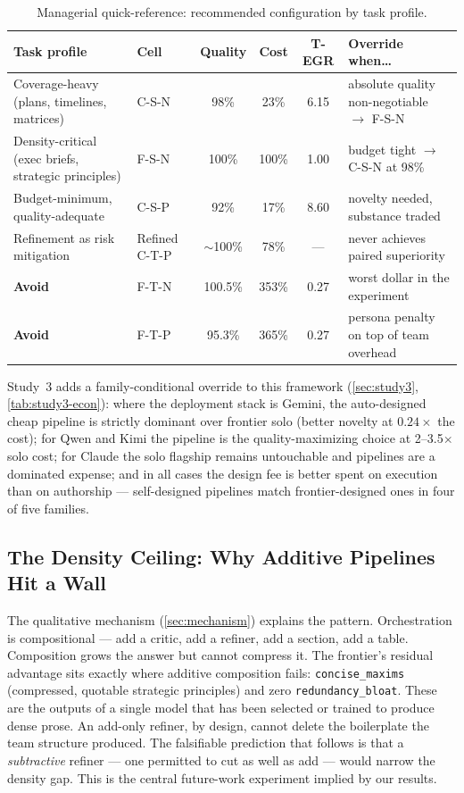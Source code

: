 \documentclass[12pt,a4paper]{article}
\begin{document}
\begin{table}[ht]
  \centering
  \caption{Managerial quick-reference: recommended configuration by task profile.}
  \label{tab:managerial}
  \begin{tabularx}{\textwidth}{@{}l l cc c l@{}}
    \toprule
    \textbf{Task profile} & \textbf{Cell} & \textbf{Quality} & \textbf{Cost} & \textbf{T-EGR} & \textbf{Override when\ldots} \\
    \midrule
    Coverage-heavy (plans, timelines, matrices)
      & C-S-N & 98\% & 23\% & 6.15
      & absolute quality non-negotiable $\to$ F-S-N \\
    Density-critical (exec briefs, strategic principles)
      & F-S-N & 100\% & 100\% & 1.00
      & budget tight $\to$ C-S-N at 98\% \\
    Budget-minimum, quality-adequate
      & C-S-P & 92\% & 17\% & 8.60
      & novelty needed, substance traded \\
    Refinement as risk mitigation
      & Refined C-T-P & $\sim$100\% & 78\% & ---
      & never achieves paired superiority \\
    \textbf{Avoid}
      & F-T-N & 100.5\% & 353\% & 0.27
      & worst dollar in the experiment \\
    \textbf{Avoid}
      & F-T-P & 95.3\% & 365\% & 0.27
      & persona penalty on top of team overhead \\
    \bottomrule
  \end{tabularx}
\end{table}

Study~3 adds a family-conditional override to this framework
(\cref{sec:study3}, \cref{tab:study3-econ}): where the deployment stack is
Gemini, the auto-designed cheap pipeline is strictly dominant over frontier
solo (better novelty at $0.24\times$ the cost); for Qwen and Kimi the pipeline
is the quality-maximizing choice at 2--3.5$\times$ solo cost; for Claude the
solo flagship remains untouchable and pipelines are a dominated expense; and in
all cases the design fee is better spent on execution than on authorship ---
self-designed pipelines match frontier-designed ones in four of five families.

\subsection{The Density Ceiling: Why Additive Pipelines Hit a Wall}

The qualitative mechanism (\cref{sec:mechanism}) explains the pattern.
Orchestration is compositional --- add a critic, add a refiner, add a section,
add a table. Composition grows the answer but cannot compress it. The frontier's
residual advantage sits exactly where additive composition fails:
\texttt{concise\_maxims} (compressed, quotable strategic principles) and zero
\texttt{redundancy\_bloat}. These are the outputs of a single model that has
been selected or trained to produce dense prose. An add-only refiner, by design,
cannot delete the boilerplate the team structure produced. The falsifiable
prediction that follows is that a \emph{subtractive} refiner --- one permitted
to cut as well as add --- would narrow the density gap. This is the central
future-work experiment implied by our results.
\end{document}
